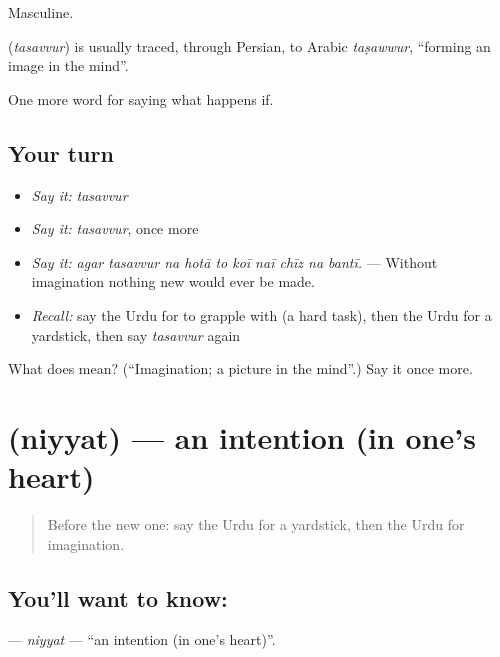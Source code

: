 Masculine.

\begin{cousinweb}
\textbf{} (\emph{tasavvur}) is usually traced, through Persian, to Arabic \emph{taṣawwur}, \textquotedblleft{}forming an image in the mind\textquotedblright{}.
\end{cousinweb}

\begin{grammarlens}[title={What you've built}]
One more word for saying what happens if.
\end{grammarlens}

\subsection*{Your turn}
\begin{itemize}
\raggedright
  \item \emph{Say it:} \emph{tasavvur}
  \item \emph{Say it:} \emph{tasavvur}, once more
  \item \emph{Say it:} \emph{agar tasavvur na hotā to koī naī chīz na bantī.} — Without imagination nothing new would ever be made.
  \item \emph{Recall:} say the Urdu for to grapple with (a hard task), then the Urdu for a yardstick, then say \emph{tasavvur} again
\end{itemize}

\begin{tcolorbox}[breakable,colback=teal!4,colframe=teal!35!black,title={Before you move on}]
What does  mean? (\textquotedblleft{}Imagination; a picture in the mind\textquotedblright{}.) Say it once more.
\end{tcolorbox}
\section[\texorpdfstring{\ur{نیت} (niyyat)}{نیت (niyyat)}]{ (niyyat) — an intention (in one's heart)}

\label{lesson:UR-C547-niyyat}



\begin{quote}
Before the new one: say the Urdu for a yardstick, then the Urdu for imagination.
\end{quote}

\subsection*{You'll want to know: }
\textbf{} — \emph{niyyat} — \textquotedblleft{}an intention (in one's heart)\textquotedblright{}.

